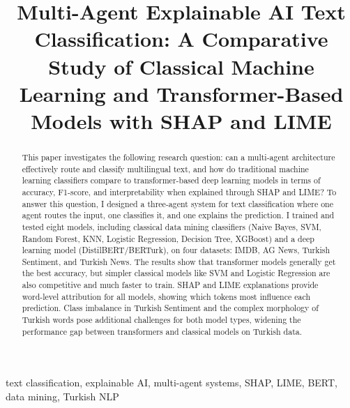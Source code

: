 \documentclass[conference]{IEEEtran}
\begin{document}
\title{Multi-Agent Explainable AI Text Classification: A Comparative Study
	of Classical Machine Learning and Transformer-Based Models with SHAP and LIME\\
}

\author{
}

\maketitle

\begin{abstract}
This paper investigates the following research question: can a multi-agent architecture
effectively route and classify multilingual text, and how do traditional machine learning
classifiers compare to transformer-based deep learning models in terms of accuracy,
F1-score, and interpretability when explained through SHAP and LIME? To answer this
question, I designed a three-agent system for text classification where one agent routes
the input, one classifies it, and one explains the prediction. I trained and tested eight
models, including classical data mining classifiers (Naive Bayes, SVM, Random Forest, KNN,
Logistic Regression, Decision Tree, XGBoost) and a deep learning model (DistilBERT/BERTurk),
on four datasets: IMDB, AG News, Turkish Sentiment, and Turkish News. The results show that
transformer models generally get the best accuracy, but simpler classical models like SVM
and Logistic Regression are also competitive and much faster to train. SHAP and LIME explanations provide word-level attribution for all models, showing which
tokens most influence each prediction. Class imbalance in Turkish Sentiment and the complex morphology
of Turkish words pose additional challenges for both model types,
widening the performance gap between transformers and classical
models on Turkish data.
\end{abstract}

\begin{IEEEkeywords}
text classification, explainable AI, multi-agent systems, SHAP, LIME, BERT, data mining,
Turkish NLP
\end{IEEEkeywords}
\end{document}
